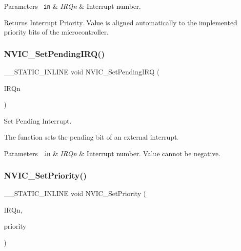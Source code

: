 \begin{DoxyParams}[1]{Parameters}
\mbox{\texttt{ in}}  & {\em I\+R\+Qn} & Interrupt number. \\
\hline
\end{DoxyParams}
\begin{DoxyReturn}{Returns}
Interrupt Priority. Value is aligned automatically to the implemented priority bits of the microcontroller. 
\end{DoxyReturn}
\mbox{\label{group___c_m_s_i_s___core___n_v_i_c_functions_ga3ecf446519da33e1690deffbf5be505f}} 
\subsubsection{\texorpdfstring{NVIC\_SetPendingIRQ()}{NVIC\_SetPendingIRQ()}}
{\footnotesize\ttfamily \+\_\+\+\_\+\+S\+T\+A\+T\+I\+C\+\_\+\+I\+N\+L\+I\+NE void N\+V\+I\+C\+\_\+\+Set\+Pending\+I\+RQ (\begin{DoxyParamCaption}\item[{\mbox{\hyperlink{group___s_a_m_d21_e15_a__cmsis_gac3af4a32370fb28c4ade8bf2add80251}{I\+R\+Qn\+\_\+\+Type}}}]{I\+R\+Qn }\end{DoxyParamCaption})}



Set Pending Interrupt. 

The function sets the pending bit of an external interrupt.


\begin{DoxyParams}[1]{Parameters}
\mbox{\texttt{ in}}  & {\em I\+R\+Qn} & Interrupt number. Value cannot be negative. \\
\hline
\end{DoxyParams}
\mbox{\label{group___c_m_s_i_s___core___n_v_i_c_functions_ga2305cbd44aaad792e3a4e538bdaf14f9}} 
\subsubsection{\texorpdfstring{NVIC\_SetPriority()}{NVIC\_SetPriority()}}
{\footnotesize\ttfamily \+\_\+\+\_\+\+S\+T\+A\+T\+I\+C\+\_\+\+I\+N\+L\+I\+NE void N\+V\+I\+C\+\_\+\+Set\+Priority (\begin{DoxyParamCaption}\item[{\mbox{\hyperlink{group___s_a_m_d21_e15_a__cmsis_gac3af4a32370fb28c4ade8bf2add80251}{I\+R\+Qn\+\_\+\+Type}}}]{I\+R\+Qn,  }\item[{uint32\+\_\+t}]{priority }\end{DoxyParamCaption})}



